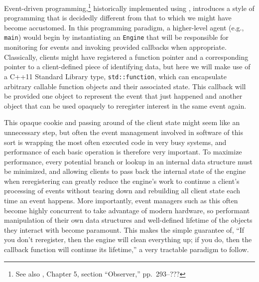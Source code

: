 Event-driven programming,\footnote{See also \cite{gamma95}, Chapter 5, section ``Observer,''  pp.~293--???} historically implemented using , introduces a style of programming that is decidedly
different from that to which we might have become accustomed. In this
programming paradigm, a higher-level agent (e.g., \lstinline!main!) would
begin by instantiating an \lstinline!Engine! that will be responsible for
monitoring for events and invoking provided callbacks when appropriate.
Classically, clients might have registered a function pointer and a
corresponding pointer to a client-defined piece of identifying data, but
here we will make use of a C++11 Standard Library type,
\lstinline!std::function!, which can encapsulate arbitrary callable
function objects and their associated state. This callback will be
provided one object to represent the event that just happened and
another object that can be used opaquely to reregister interest in the
same event again.

This opaque cookie and passing around of the client state might seem
like an unnecessary step, but often the event management involved in
software of this sort is wrapping the most often executed code in very
busy systems, and performance of each basic operation is therefore very
important. To maximize performance, every potential branch or lookup in
an internal data structure must be minimized, and allowing clients to
pass back the internal state of the engine when reregistering can
greatly reduce the engine's work to continue a client's processing of
events without tearing down and rebuilding all client state each time an
event happens. More importantly, event managers such as this often
become highly concurrent to take advantage of modern hardware, so
performant manipulation of their own data structures and well-defined
lifetime of the objects they interact with become paramount. This makes
the simple guarantee of, ``If you don't reregister, then the engine will
clean everything up; if you do, then the callback function will continue
its lifetime,'' a very tractable paradigm to follow.

